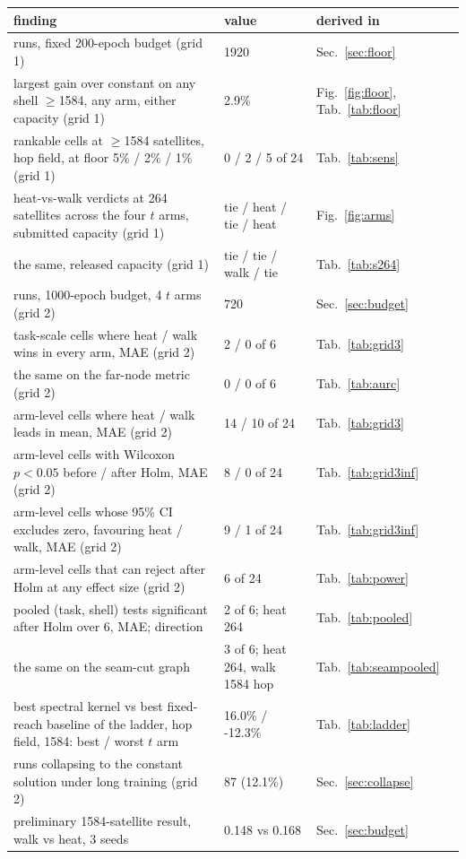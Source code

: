 \begin{tabular}{@{}p{}p{}p{}@{}}
\toprule
finding & value & derived in \\
\midrule
runs, fixed 200-epoch budget (grid 1) & 1920 & Sec.~\ref{sec:floor} \\
largest gain over constant on any shell $\geq$1584, any arm, either capacity (grid 1) & 2.9\% & Fig.~\ref{fig:floor}, Tab.~\ref{tab:floor} \\
rankable cells at $\geq$1584 satellites, hop field, at floor 5\% / 2\% / 1\% (grid 1) & 0 / 2 / 5 of 24 & Tab.~\ref{tab:sens} \\
heat-vs-walk verdicts at 264 satellites across the four $t$ arms, submitted capacity (grid 1) & tie / heat / tie / heat & Fig.~\ref{fig:arms} \\
the same, released capacity (grid 1) & tie / tie / walk / tie & Tab.~\ref{tab:s264} \\
runs, 1000-epoch budget, 4 $t$ arms (grid 2) & 720 & Sec.~\ref{sec:budget} \\
task-scale cells where heat / walk wins in every arm, MAE (grid 2) & 2 / 0 of 6 & Tab.~\ref{tab:grid3} \\
the same on the far-node metric (grid 2) & 0 / 0 of 6 & Tab.~\ref{tab:aurc} \\
arm-level cells where heat / walk leads in mean, MAE (grid 2) & 14 / 10 of 24 & Tab.~\ref{tab:grid3} \\
arm-level cells with Wilcoxon $p<0.05$ before / after Holm, MAE (grid 2) & 8 / 0 of 24 & Tab.~\ref{tab:grid3inf} \\
arm-level cells whose 95\% CI excludes zero, favouring heat / walk, MAE (grid 2) & 9 / 1 of 24 & Tab.~\ref{tab:grid3inf} \\
arm-level cells that can reject after Holm at any effect size (grid 2) & 6 of 24 & Tab.~\ref{tab:power} \\
pooled (task, shell) tests significant after Holm over 6, MAE; direction & 2 of 6; heat 264 & Tab.~\ref{tab:pooled} \\
the same on the seam-cut graph & 3 of 6; heat 264, walk 1584 hop & Tab.~\ref{tab:seampooled} \\
best spectral kernel vs best fixed-reach baseline of the ladder, hop field, 1584: best / worst $t$ arm & 16.0\% / -12.3\% & Tab.~\ref{tab:ladder} \\
runs collapsing to the constant solution under long training (grid 2) & 87 (12.1\%) & Sec.~\ref{sec:collapse} \\
preliminary 1584-satellite result, walk vs heat, 3 seeds & 0.148 vs 0.168 & Sec.~\ref{sec:budget} \\
\bottomrule
\end{tabular}
